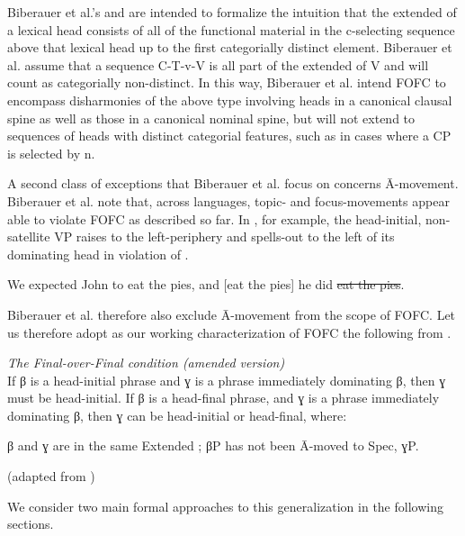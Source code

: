 \documentclass[output=paper]{langscibook}
\begin{document}
Biberauer et al.'s  and  are intended to formalize the intuition that the extended  of a lexical head consists of all of the functional material in the c-selecting sequence above that lexical head up to the first categorially distinct element.  Biberauer et al. assume that a sequence C-T-v-V is all part of the extended  of V and will count as categorially non-distinct. In this way, Biberauer et al. intend FOFC to encompass disharmonies of the above type involving heads in a canonical clausal spine as well as those in a canonical nominal spine, but will not extend to sequences of heads with distinct categorial features, such as in cases where a CP is selected by n.

A second class of exceptions that Biberauer et al. focus on concerns Ā-movement.   Biberauer et al. note that, across languages, topic- and focus-movements appear able to violate FOFC as described so far. In , for example, the head-initial, non-satellite VP raises to the left-periphery and spells-out to the left of its dominating head in violation of \protect{}.
 
\ea \label{ex:haddican:8} We expected John to eat the pies, and [eat the pies] he did \st{eat the pies}.\\
\citep{biberaueretal2014} \z
 
Biberauer et al. therefore also exclude Ā-movement from the scope of FOFC.   Let us therefore adopt as our working characterization of FOFC the following from \cite{biberaueretal2014}.

\ea \textit{The Final-over-Final condition (amended version)}\\\protect\label{fofc2}If β is a head-initial phrase and ɣ is a phrase immediately dominating β, then ɣ must be head-initial. If β is a head-final phrase, and ɣ is a phrase immediately dominating β, then  ɣ can be head-initial or head-final, where: 
\begin{xlisti}
\ex  β and ɣ are in the same Extended ; 
\ex βP has not been Ā-moved to Spec, ɣP.
\end{xlisti}
(adapted from \cite{biberaueretal2014}) 
\z 

We consider two main formal approaches to this generalization in the following sections.
 
\end{document}
